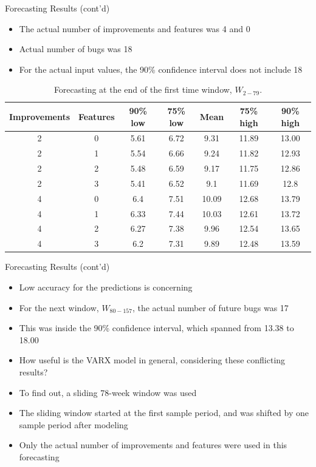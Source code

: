 \documentclass[presentation]{beamer}
\begin{document}
\begin{frame}[t]{Forecasting Results (cont'd)}
\footnotesize{
\begin{itemize}
\item{The actual number of improvements and features was 4 and 0}
\item{Actual number of bugs was 18}
\item{For the actual input values, the 90\% confidence interval does not include 18}
\end{itemize}

\vspace{-.5cm}
\begin{table}[htbp]
  \centering
\caption{Forecasting at the end of the first time window, $W_{2-79}$.}
  \begin{tabular}{ c | c | c | c | c | c | c }
    Improvements & Features & 90\% low & 75\% low & Mean & 75\% high & 90\% high \\
    \hline
2 & 0 & 5.61 & 6.72 & 9.31 & 11.89 & 13.00 \\
2 & 1 & 5.54 & 6.66 & 9.24 & 11.82 & 12.93 \\
2 & 2 & 5.48 & 6.59 & 9.17 & 11.75 & 12.86 \\
2 & 3 & 5.41 & 6.52 & 9.1 & 11.69 & 12.8 \\
4 & 0 & 6.4 & 7.51 & 10.09 & 12.68 & 13.79 \\
4 & 1 & 6.33 & 7.44 & 10.03 & 12.61 & 13.72 \\
4 & 2 & 6.27 & 7.38 & 9.96 & 12.54 & 13.65 \\
4 & 3 & 6.2 & 7.31 & 9.89 & 12.48 & 13.59 \\
    \hline
  \end{tabular}
\end{table}
}
\end{frame}


\begin{frame}[t]{Forecasting Results (cont'd)}
\begin{itemize}
\item{Low accuracy for the predictions is concerning}
\item{For the next window, $W_{80−157}$, the actual number of future bugs was 17}
\item{This was inside the 90\% confidence interval, which spanned from 13.38 to 18.00}
\item{How useful is the VARX model in general, considering these conflicting results?}
\item{To find out, a sliding 78-week window was used}
\item{The sliding window started at the first sample period, and was shifted by one sample period after modeling}
\item{Only the actual number of improvements and features were used in this forecasting}
\end{itemize}
\end{frame}
\end{document}

